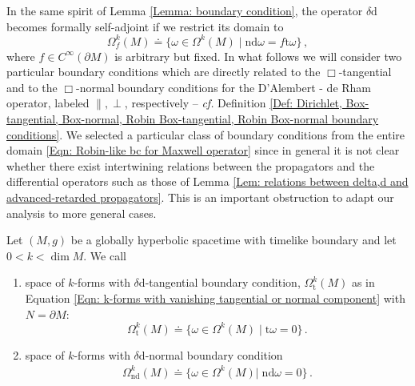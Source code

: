 In the same spirit of Lemma \ref{Lemma: boundary condition}, the operator $\delta\mathrm{d}$ becomes formally self-adjoint if we restrict its domain to 
\begin{equation}\label{Eqn: Robin-like bc for Maxwell operator}
\Omega^k_f(M)\doteq\{\omega\in\Omega^k(M)\;|\;\mathrm{nd}\omega=f\mathrm{t}\omega\}\,,
\end{equation}
where $f\in C^\infty(\partial M)$ is arbitrary but fixed.
In what follows we will consider two particular boundary conditions which are directly related to the $\Box$-tangential and to the $\Box$-normal boundary conditions for the D'Alembert - de Rham operator, labeled $\parallel,\perp$, respectively -- \textit{cf.} Definition \ref{Def: Dirichlet, Box-tangential, Box-normal, Robin Box-tangential, Robin Box-normal boundary conditions}.
We selected a particular class of boundary conditions from the entire domain \eqref{Eqn: Robin-like bc for Maxwell operator} since in general it is not clear whether there exist intertwining relations between the propagators and the differential operators such as those of Lemma \ref{Lem: relations between delta,d and advanced-retarded propagators}. This is an important obstruction to adapt our analysis to more general cases.

\begin{Definition}\label{Def: g-Dirichelet, g-Neumann boundary conditions and solution spaces}
	Let $(M,g)$ be a globally hyperbolic spacetime with timelike boundary and let $0<k<\dim M$.
	We call
	\begin{enumerate}
		\item space of $k$-forms with $\delta\mathrm{d}$-tangential boundary condition, $\Omega_{\mathrm{t}}^k(M)$ as in Equation \eqref{Eqn: k-forms with vanishing tangential or normal component} with $N=\partial M$:
		\begin{equation}
		\Omega_{\mathrm{t}}^k(M)\doteq\lbrace\omega\in\Omega^k(M)\;|\;\mathrm{t}\omega=0\rbrace\,.
		\end{equation}
		\item space of $k$-forms with $\delta\mathrm{d}$-normal boundary condition
		\begin{align}\label{Eqn: deltad-normal bc}
		\Omega_{\mathrm{nd}}^k(M)\doteq\lbrace\omega\in\Omega^k(M)|\;\mathrm{n}\mathrm{d}\omega=0\rbrace\,.
		\end{align}
	\end{enumerate} 
\end{Definition}


